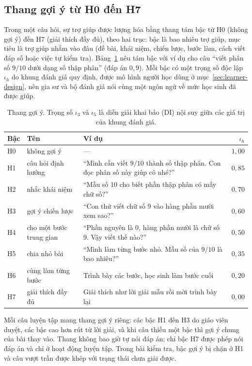 \subsection{Thang gợi ý từ H0 đến H7}
Trong một câu hỏi, sự trợ giúp được lượng hóa bằng thang tám bậc từ H0 (không gợi ý) đến H7 (giải thích đầy đủ), theo hai trục: bậc là bao nhiêu trợ giúp, mục tiêu là trợ giúp nhắm vào đâu (đề bài, khái niệm, chiến lược, bước làm, cách viết đáp số hoặc việc tự kiểm tra). Bảng~\ref{tab:ladder} nêu tám bậc với ví dụ cho câu ``viết phân số $9/10$ dưới dạng số thập phân'' (đáp án $0{,}9$). Mỗi bậc có một trọng số độc lập $\iota_h$ do khung đánh giá quy định, được mô hình người học dùng ở mục~\ref{sec:learner-design}, nên gia sư và bộ đánh giá nói cùng một ngôn ngữ về mức học sinh đã được giúp.

\begin{table}[H]
\centering
\caption{Thang gợi ý. Trọng số $\iota_3$ và $\iota_5$ là diễn giải khai báo (DI) nội suy giữa các giá trị của khung đánh giá.}\label{tab:ladder}
\small
\begin{tabular}{>{\raggedright\arraybackslash}p{0.9cm}>{\raggedright\arraybackslash}p{2.9cm}>{\raggedright\arraybackslash}p{8.4cm}r}
\toprule
Bậc & Tên & Ví dụ & $\iota_h$ \\
\midrule
H0 & không gợi ý & --- & $1{,}00$ \\
H1 & câu hỏi định hướng & ``Mình cần viết $9/10$ thành số thập phân. Con đọc phân số này giúp cô nhé?'' & $0{,}85$ \\
H2 & nhắc khái niệm & ``Mẫu số 10 cho biết phần thập phân có mấy chữ số?'' & $0{,}70$ \\
H3 & gợi ý chiến lược & ``Con thử viết chữ số 9 vào hàng phần mười xem sao?'' & $0{,}60$ \\
H4 & cho một bước trung gian & ``Phần nguyên là 0, hàng phần mười là chữ số 9. Vậy viết thế nào?'' & $0{,}50$ \\
H5 & chia nhỏ bài & ``Mình làm từng bước nhỏ. Mẫu số của $9/10$ là bao nhiêu?'' & $0{,}35$ \\
H6 & cùng làm từng bước & Trình bày các bước, học sinh làm bước cuối & $0{,}20$ \\
H7 & giải thích đầy đủ & Giải thích như lời giải mẫu rồi mời trình bày lại & $0{,}00$ \\
\bottomrule
\end{tabular}
\end{table}

Mỗi câu luyện tập mang thang gợi ý riêng: các bậc H1 đến H3 do giáo viên duyệt, các bậc cao hơn rút từ lời giải, và khi câu thiếu một bậc thì gợi ý chung của bài thay vào. Thang không bao giờ tự nói đáp án; chỉ bậc H7 được phép nói đáp án và chỉ ở hoạt động luyện tập. Trong bài kiểm tra, bậc gợi ý bị chặn ở H1 và câu vượt trần được khép với trạng thái chưa giải được.

